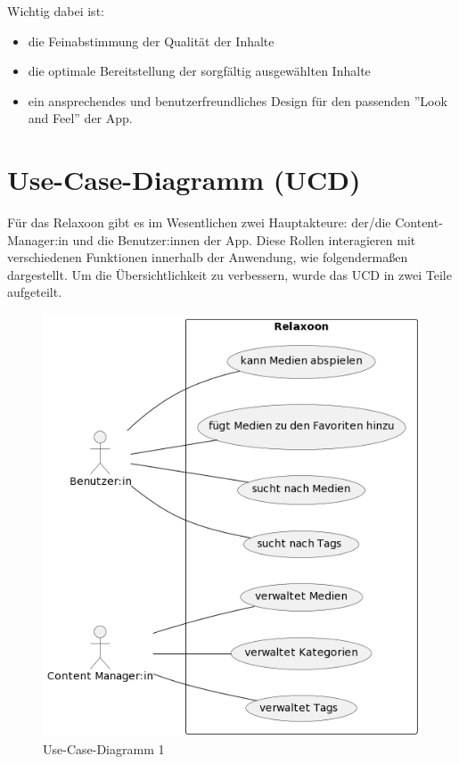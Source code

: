 Wichtig dabei ist: 

\begin{itemize}
    \item die Feinabstimmung der Qualität der Inhalte
    \item die optimale Bereitstellung der sorgfältig ausgewählten Inhalte
    \item ein ansprechendes und benutzerfreundliches Design für den passenden ''Look and Feel'' der App.
\end{itemize}

\section{Use-Case-Diagramm (UCD)}

Für das Relaxoon gibt es im Wesentlichen zwei Hauptakteure: der/die Content-Manager:in und die Benutzer:innen der 
App. Diese Rollen interagieren mit verschiedenen Funktionen innerhalb der Anwendung, wie folgendermaßen 
dargestellt. Um die Übersichtlichkeit zu verbessern, wurde das UCD in zwei Teile aufgeteilt.

\begin{figure}[H]
    \centering
    \includegraphics[height=\textwidth]{./pics/ucd1.png}
    \caption{Use-Case-Diagramm 1}
\end{figure}

